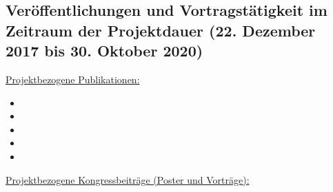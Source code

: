 \subsection*{Veröffentlichungen und Vortragstätigkeit im Zeitraum der Projektdauer (22. Dezember 2017 bis 30. Oktober 2020)}
\label{cha:publications}

\underline{Projektbezogene Publikationen:}


\begin{itemize}
   
    \item 
    \item
    \item
    \item
    \item

\end{itemize}

\underline{Projektbezogene Kongressbeiträge (Poster und Vorträge):}

